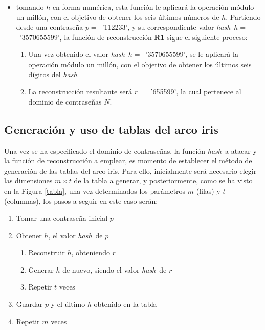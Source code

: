 \documentclass[12pt,spanish,listoffigures,listoftables,listofalgorithms]{tfgetsinf}
\newcommand{\hash}{\textit{hash}}
\begin{document}
\begin{itemize}

	\item tomando $h$ en forma numérica, esta función le aplicará la operación módulo un millón, con el objetivo de obtener los seis últimos números de $h$. Partiendo desde una contraseña $p = $~'112233', y su correspondiente valor \hash~$h = $~'3570655599', la función de reconstrucción \textbf{R1} sigue el siguiente proceso:

		\begin{enumerate}

			\item Una vez obtenido el valor \hash~$h = $~'3570655599', se le aplicará la operación módulo un millón, con el objetivo de obtener los últimos seis dígitos del \hash.

			\item La reconstrucción resultante será $r = $~'655599', la cual pertenece al dominio de contraseñas $N$.

		\end{enumerate}

\end{itemize}

\subsection{Generación y uso de tablas del arco iris}

Una vez se ha especificado el dominio de contraseñas, la función \hash~a atacar y la función de reconstrucción a emplear, es momento de establecer el método de generación de las tablas del arco iris. Para ello, inicialmente será necesario elegir las dimensiones $m \times t$ de la tabla a generar, y posteriormente, como se ha visto en la Figura \ref{tabla}, una vez determinados los parámetros $m$ (filas) y $t$ (columnas), los pasos a seguir en este caso serán:

\begin{enumerate}[label*=\arabic*.]

    \item Tomar una contraseña inicial $p$
    
    \item Obtener $h$, el valor \hash~de $p$
    
    \begin{enumerate}[label*=\arabic*.]
    
        \item Reconstruir $h$, obteniendo $r$
        
        \item Generar $h$ de nuevo, siendo el valor \hash~de $r$
        
        \item Repetir $t$ veces
        
    \end{enumerate}
    
    \item Guardar $p$ y el último $h$ obtenido en la tabla
    
    \item Repetir $m$ veces
    
\end{enumerate}
\end{document}
